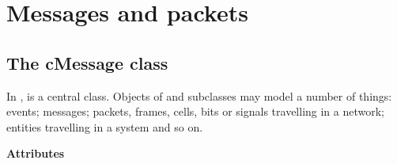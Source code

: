 \section{Messages and packets}

\subsection{The cMessage class}

In {\opp},  is a central class. Objects of  and
subclasses may model a number of things: events;
messages; packets,
frames, cells, bits or signals travelling
in a network; entities travelling in a system and so on.


\textbf{Attributes}


